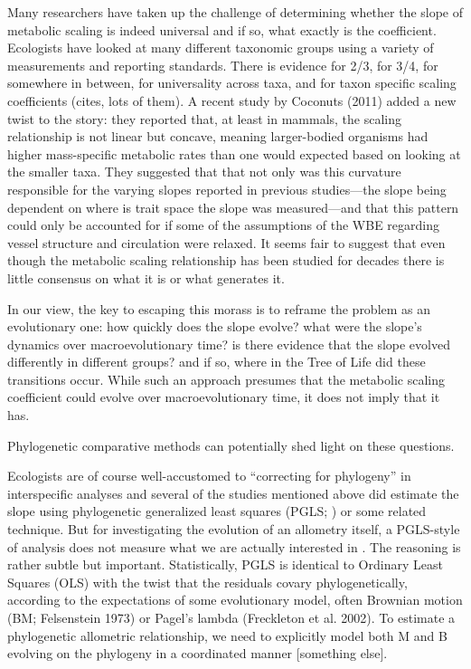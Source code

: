 \documentclass[a4paper,11pt]{article}
\begin{document}
Many researchers have taken up the challenge of determining whether the slope of metabolic scaling is indeed universal and if so, what exactly is the coefficient. Ecologists have looked at many different taxonomic groups using a variety of measurements and reporting standards. There is evidence for 2/3, for 3/4, for somewhere in between, for universality across taxa, and for taxon specific scaling coefficients (cites, lots of them). A recent study by Coconuts (2011) added a new twist to the story: they reported that, at least in mammals, the scaling relationship is not linear but concave, meaning larger-bodied organisms had higher mass-specific metabolic rates than one would expected based on looking at the smaller taxa. They suggested that that not only was this curvature responsible for the varying slopes reported in previous studies—the slope being dependent on where is trait space the slope was measured—and that this pattern could only be accounted for if some of the assumptions of the WBE regarding vessel structure and circulation were relaxed. It seems fair to suggest that even though the metabolic scaling relationship has been studied for decades there is little consensus on what it is or what generates it.

In our view, the key to escaping this morass is to reframe the problem as an evolutionary one: how quickly does the slope evolve? what were the slope’s dynamics over macroevolutionary time? is there evidence that the slope evolved differently in different groups? and if so, where in the Tree of Life did these transitions occur. While such an approach presumes that the metabolic scaling coefficient could evolve over macroevolutionary time, it does not imply that it has.

Phylogenetic comparative methods can potentially shed light on these questions.

Ecologists are of course well-accustomed to “correcting for phylogeny”  in interspecific analyses and several of the studies mentioned above did estimate the slope using phylogenetic generalized least squares (PGLS; \citep{Grafen 1989, HansenMartins1997}) or some related technique. But for investigating the evolution of an allometry itself, a PGLS-style of analysis does not measure what we are actually interested in \citep{hansen2005, hansen2012}. The reasoning is rather subtle but important. Statistically, PGLS is identical to Ordinary Least Squares (OLS) with the twist that the residuals covary phylogenetically, according to the expectations of some evolutionary model, often Brownian motion (BM; Felsenstein 1973) or Pagel’s lambda (Freckleton et al. 2002). To estimate a phylogenetic allometric relationship, we need to explicitly model both M and B evolving on the phylogeny in a coordinated manner [something else].
\end{document}
